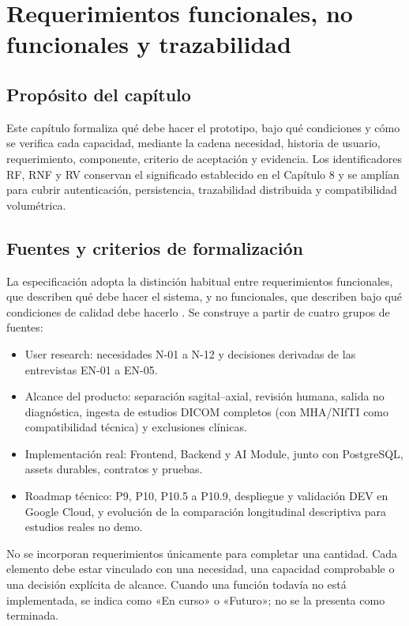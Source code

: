 \chapter{Requerimientos funcionales, no funcionales y trazabilidad}
\label{chap:requerimientos}

\section{Propósito del capítulo}

Este capítulo formaliza qué debe hacer el prototipo, bajo qué condiciones y cómo se verifica cada capacidad, mediante la cadena necesidad, historia de usuario, requerimiento, componente, criterio de aceptación y evidencia. Los identificadores RF, RNF y RV conservan el significado establecido en el Capítulo 8 y se amplían para cubrir autenticación, persistencia, trazabilidad distribuida y compatibilidad volumétrica.

\section{Fuentes y criterios de formalización}

La especificación adopta la distinción habitual entre requerimientos funcionales, que describen qué debe hacer el sistema, y no funcionales, que describen bajo qué condiciones de calidad debe hacerlo \parencite{wiegers_software_requirements_2013}. Se construye a partir de cuatro grupos de fuentes:

\begin{itemize}
  \item User research: necesidades N-01 a N-12 y decisiones derivadas de las entrevistas EN-01 a EN-05.
  \item Alcance del producto: separación sagital–axial, revisión humana, salida no diagnóstica, ingesta de estudios DICOM completos (con MHA/NIfTI como compatibilidad técnica) y exclusiones clínicas.
  \item Implementación real: Frontend, Backend y AI Module, junto con PostgreSQL, assets durables, contratos y pruebas.
  \item Roadmap técnico: P9, P10, P10.5 a P10.9, despliegue y validación DEV en Google Cloud, y evolución de la comparación longitudinal descriptiva para estudios reales no demo.
\end{itemize}

No se incorporan requerimientos únicamente para completar una cantidad. Cada elemento debe estar vinculado con una necesidad, una capacidad comprobable o una decisión explícita de alcance. Cuando una función todavía no está implementada, se indica como «En curso» o «Futuro»; no se la presenta como terminada.

